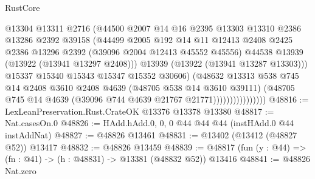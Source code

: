 \begin{lexlean}{RustCore}
\begin{coremodule}
                                @13304
                                @13311
                                @2716
                                (@44500
                                  @2007
                                  @14
                                  @16
                                  @2395
                                  @13303
                                  @13310
                                  @2386
                                  @13286
                                  @2392
                                  @39158
                                  (@44499
                                    @2005
                                    @192
                                    @14
                                    @11
                                    @12413
                                    @2408
                                    @2425
                                    @2386
                                    @13296
                                    @2392
                                    (@39096 @2004 @12413 @45552 @45556)
                                    @44538
                                    @13939
                                    (@13922 (@13941 @13297 @2408)))
                                  @13939
                                  (@13922 (@13941 @13287 @13303)))
                                @15337
                                @15340
                                @15343
                                @15347
                                @15352
                                @30606)
                              (@48632
                                @13313
                                @538
                                @745
                                @14
                                @2408
                                @3610
                                @2408
                                @4639
                                (@48705 @538 @14 @3610 @39111)
                                (@48705
                                  @745
                                  @14
                                  @4639
                                  (@39096 @744 @4639 @21767 @21771))))))))))))))))
@48816 := LexLeanPreservation.Rust.CrateOK @13376 @13378 @13380
@48817 := Nat.casesOn.{0}
@48826 := HAdd.hAdd.{0, 0, 0} @44 @44 @44 (instHAdd.{0} @44 instAddNat)
@48827 := @48826 @13461
@48831 := @13402 (@13412 (@48827 @52)) @13417
@48832 := @48826 @13459
@48839 := @48817 (fun (y : @44) => (fn : @41) -> (h : @48831) -> @13381 (@48832 @52)) @13416
@48841 := @48826 Nat.zero

\end{coremodule}
\end{lexlean}
